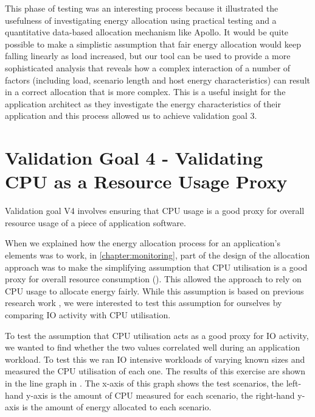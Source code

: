 This phase of testing was an interesting process because it illustrated the usefulness of investigating energy allocation using practical testing and a quantitative data-based allocation mechanism like Apollo.  It would be quite possible to make a simplistic assumption that fair energy allocation would keep falling linearly as load increased, but our tool can be used to provide a more sophisticated analysis that reveals how a complex interaction of a number of factors (including load, scenario length and host energy characteristics) can result in a correct allocation that is more complex.  This is a useful insight for the application architect as they investigate the energy characteristics of their application and this process allowed us to achieve validation goal 3.

\section{Validation Goal 4 - Validating CPU as a Resource Usage Proxy}

Validation goal V4 involves ensuring that CPU usage is a good proxy for overall resource usage of a piece of application software.

When we explained how the energy allocation process for an application's elements was to work, in \cref{chapter:monitoring}, part of the design of the allocation approach was to make the simplifying assumption that CPU utilisation is a good proxy for overall resource consumption ().  This allowed  the approach to rely on CPU usage to allocate energy fairly.  While this assumption is based on previous research work \cite{bashroush2018_hardwarerefresh}, we were interested to test this assumption for ourselves by comparing IO activity with CPU utilisation.  

To test the assumption that CPU utilisation acts as a good proxy for IO activity, we wanted to find whether the two values correlated well during an application workload.  To test this we ran IO intensive workloads of varying known sizes and measured the CPU utilisation of each one.  The results of this exercise are shown in the line graph in .  The x-axis of this graph shows the test scenarios, the left-hand y-axis is the amount of CPU measured for each scenario, the right-hand y-axis is the amount of energy allocated to each scenario.

